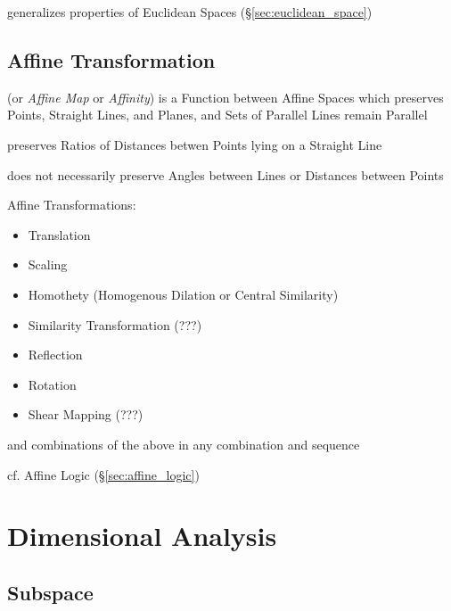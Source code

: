 generalizes properties of Euclidean Spaces (\S\ref{sec:euclidean_space})



\subsection{Affine Transformation}\label{sec:affine_transformation}

(or \emph{Affine Map} or \emph{Affinity}) is a Function between Affine
Spaces which preserves Points, Straight Lines, and Planes, and Sets of
Parallel Lines remain Parallel

preserves Ratios of Distances betwen Points lying on a Straight Line

does not necessarily preserve Angles between Lines or Distances
between Points

Affine Transformations:
\begin{itemize}
\item Translation
\item Scaling
\item Homothety (Homogenous Dilation or Central Similarity)
\item Similarity Transformation (???)
\item Reflection
\item Rotation
\item Shear Mapping (???)
\end{itemize}
and combinations of the above in any combination and sequence

cf. Affine Logic (\S\ref{sec:affine_logic})



\section{Dimensional Analysis}\label{sec:dimensional_analysis}

\subsection{Subspace}\label{sec:subspace}

